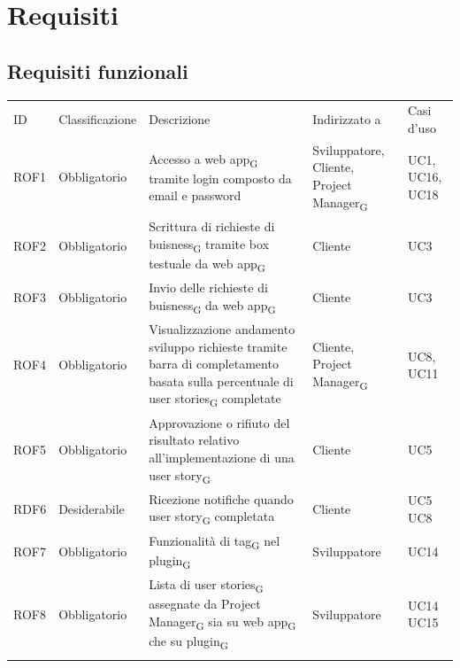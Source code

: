 \documentclass{article}
\begin{document}
\newpage
\section{Requisiti}
\subsection{Requisiti funzionali}
\begin{center}
    \begin{tabular}{|p{2cm}|p{3cm}|p{6cm}|p{3cm}|p{2cm}|}
    \rowcolor{Blue} 
\hline
ID & Classificazione & Descrizione & Indirizzato a&Casi d'uso  \\ 
\rowcolor{LightBlue}
\hline
ROF1&Obbligatorio & Accesso a web app\textsubscript{G} tramite login composto da email e password & Sviluppatore, Cliente, Project Manager\textsubscript{G} & UC1, UC16, UC18 \\ 
\rowcolor{LighterBlue}
\hline
ROF2&Obbligatorio & Scrittura di richieste di buisness\textsubscript{G} tramite box testuale da web app\textsubscript{G} & Cliente & UC3\\ 
\rowcolor{LightBlue}
\hline
ROF3&Obbligatorio & Invio delle richieste di buisness\textsubscript{G} da web app\textsubscript{G} & Cliente & UC3\\
\hline
\rowcolor{LighterBlue}

ROF4&Obbligatorio & Visualizzazione andamento sviluppo richieste tramite barra di completamento basata sulla percentuale di user stories\textsubscript{G} completate & Cliente, Project Manager\textsubscript{G} & UC8, UC11\\
\rowcolor{LightBlue}
\hline
ROF5&Obbligatorio & Approvazione o rifiuto del risultato relativo all'implementazione di una user story\textsubscript{G} & Cliente & UC5\\
\hline
\rowcolor{LighterBlue}

RDF6&Desiderabile & Ricezione notifiche quando user story\textsubscript{G} completata & Cliente & UC5 UC8\\
\hline
\rowcolor{LightBlue}
\hline
ROF7&Obbligatorio & Funzionalità di tag\textsubscript{G} nel plugin\textsubscript{G}  & Sviluppatore & UC14\\
\hline
\rowcolor{LighterBlue}

ROF8&Obbligatorio & Lista di user stories\textsubscript{G} assegnate da Project Manager\textsubscript{G} sia su web app\textsubscript{G} che su plugin\textsubscript{G} & Sviluppatore & UC14 UC15\\
\hline
\rowcolor{LightBlue}


\end{tabular}
\end{center}
\end{document}

